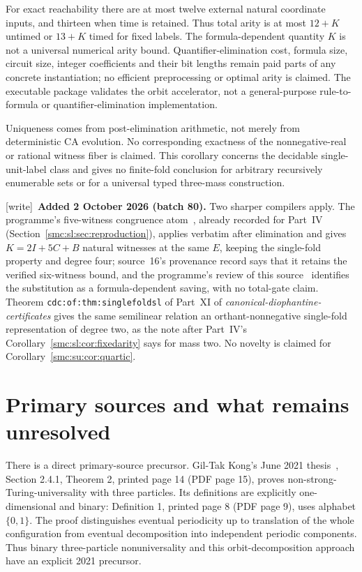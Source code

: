 \documentclass[11pt,letterpaper]{article}
\numberwithin{equation}{section}
\theoremstyle{definition}
\theoremstyle{remark}
\newcommand{\wtag}{\textup{[write]}}
\begin{document}
For exact reachability there are at most twelve external natural coordinate
inputs, and thirteen when time is retained. Thus total arity is at most
$12+K$ untimed or $13+K$ timed for fixed labels. The formula-dependent quantity
$K$ is not a universal numerical arity bound. Quantifier-elimination cost,
formula size, circuit size, integer coefficients and their bit lengths remain
paid parts of any concrete instantiation; no efficient preprocessing or optimal
arity is claimed. The executable package validates the orbit accelerator, not
a general-purpose rule-to-formula or quantifier-elimination implementation.

Uniqueness comes from post-elimination arithmetic, not merely from deterministic
CA evolution. No corresponding exactness of the nonnegative-real or rational
witness fiber is claimed. This corollary concerns the decidable single-unit-label
class and gives no finite-fold conclusion for arbitrary recursively enumerable
sets or for a universal typed three-mass construction.

\wtag\ \textbf{Added 2 October 2026 (batch 80).} Two sharper compilers apply. The programme's five-witness congruence atom~\cite{reviewcong}, already recorded for Part~IV (Section~\ref{smc:sl:sec:reproduction}), applies verbatim after elimination and gives $K=2I+5C+B$ natural witnesses at the same $E$, keeping the single-fold property and degree four; source~16's provenance record says that it retains the verified six-witness bound, and the programme's review of this source~\cite{reviewlowmass} identifies the substitution as a formula-dependent saving, with no total-gate claim. Theorem \texttt{cdc:of:thm:singlefoldsl} of Part~XI of \emph{canonical-diophantine-certificates} gives the same semilinear relation an orthant-nonnegative single-fold representation of degree two, as the note after Part~IV's Corollary~\ref{smc:sl:cor:fixedarity} says for mass two. No novelty is claimed for Corollary~\ref{smc:su:cor:quartic}.

\section{Primary sources and what remains unresolved}\label{smc:su:sec:sources}

There is a direct primary-source precursor. Gil-Tak Kong's June 2021
thesis~\cite{kongthesis}, Section 2.4.1, Theorem 2, printed page 14 (PDF page 15),
proves non-strong-Turing-universality with three particles. Its definitions are
explicitly one-dimensional and binary: Definition 1, printed page 8 (PDF page 9),
uses alphabet $\{0,1\}$. The proof distinguishes eventual periodicity up to
translation of the whole configuration from eventual decomposition into
independent periodic components. Thus binary three-particle nonuniversality
and this orbit-decomposition approach have an explicit 2021 precursor.
\end{document}
